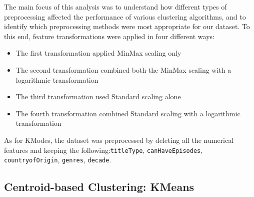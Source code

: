 \documentclass[10pt]{article}
\begin{document}
The main focus of this analysis was to understand how different types of preprocessing affected the performance of various clustering algorithms, and to identify which preprocessing methods were most appropriate for our dataset. To this end, feature transformations were applied in four different ways:
\begin{itemize}
	\item The first transformation applied MinMax scaling only
	\item The second transformation combined both the MinMax scaling with a logarithmic transformation
	\item The third transformation used Standard scaling alone
	\item The fourth transformation combined Standard scaling with a logarithmic transformation	
\end{itemize}

As for KModes, the dataset was preprocessed by deleting all the numerical features and keeping the following:\texttt{titleType}, \texttt{canHaveEpisodes}, \texttt{countryofOrigin}, \texttt{genres}, \texttt{decade}.

\subsection{Centroid-based Clustering: KMeans}
\end{document}
